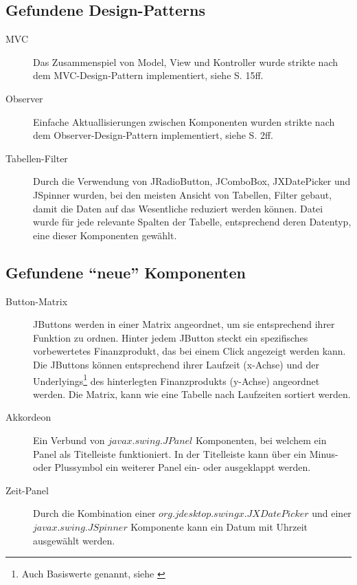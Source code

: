   \subsection{Gefundene Design-Patterns}
  
  \begin{description}
    \item[MVC]
    Das Zusammenspiel von Model, View und Kontroller wurde strikte nach dem
    MVC-Design-Pattern implementiert, siehe \cite{GUIDesignPatterns} S. 15ff.
    \item[Observer]
    Einfache Aktuallisierungen zwischen Komponenten wurden strikte nach dem
    Observer-Design-Pattern implementiert, siehe \cite{GUIDesignPatterns} S.
    2ff.
    \item[Tabellen-Filter]
    Durch die Verwendung von JRadioButton, JComboBox, JXDatePicker und JSpinner
    wurden, bei den meisten Ansicht von Tabellen, Filter gebaut, damit die Daten
    auf das Wesentliche reduziert werden können. Datei wurde für jede relevante
    Spalten der Tabelle, entsprechend deren Datentyp, eine dieser Komponenten
    gewählt.
  \end{description}
  
  \subsection{Gefundene ``neue'' Komponenten}
  
  \begin{description}
    \item[Button-Matrix]
    JButtons werden in einer Matrix angeordnet, um sie entsprechend ihrer
    Funktion zu ordnen. Hinter jedem JButton steckt ein spezifisches
    vorbewertetes Finanzprodukt, das bei einem Click angezeigt werden kann.
    Die JButtons können entsprechend ihrer Laufzeit (x-Achse) und der
    Underlyings\footnote{Auch Basiswerte genannt, siehe \cite{Basiswerte}} des
    hinterlegten Finanzprodukts (y-Achse) angeordnet werden. Die Matrix, kann
    wie eine Tabelle nach Laufzeiten sortiert werden.
    \item[Akkordeon]
    Ein Verbund von \(javax.swing.JPanel\) Komponenten, bei welchem ein
    Panel als Titelleiste funktioniert. In der Titelleiste kann über ein Minus-
    oder Plussymbol ein weiterer Panel ein- oder ausgeklappt werden.
    \item[Zeit-Panel]
    Durch die Kombination einer \(org.jdesktop.swingx.JXDatePicker\) und einer
    \(javax.swing.JSpinner\) Komponente kann ein Datum mit Uhrzeit ausgewählt
    werden.
  \end{description}
  
